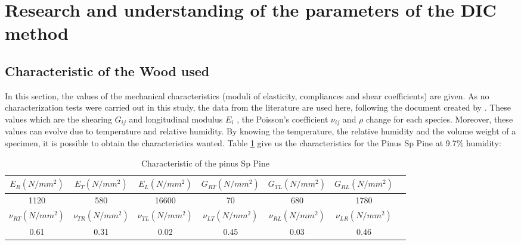 \section{Research and understanding of the parameters of the DIC method}

\subsection{Characteristic of the Wood used}

In this section, the values of the mechanical characteristics (moduli of elasticity, compliances and shear coefficients) are given. As no characterization tests were carried out in this study, the data from the literature are used here, following the document created by \cite{GuitardandElAmri1987}. These values which are the shearing $G_{ij}$ and longitudinal modulus $E_i$ , the Poisson’s coefficient $\nu_{ij}$ and $\rho$ change for each species. Moreover, these values can evolve due to temperature and relative humidity. By knowing the temperature, the relative humidity and the volume weight of a specimen, it is possible to obtain the characteristics wanted. Table \ref{fig:fig29} give us the characteristics for the Pinus Sp Pine at 9.7$\%$ humidity:


\begin{table} [h]
	\begin{tabular}{ccccccc}
		\toprule %
		  $E_R(N/mm^2)$ & $E_T(N/mm^2)$ & $E_L(N/mm^2)$ & $G_{RT}(N/mm^2)$ & $G_{TL}(N/mm^2)$ & $G_{RL}(N/mm^2)$\\\midrule
		  1120 & 580 & 16600 & 70 & 680 & 1780 \\
		\bottomrule %
		\toprule
		$\nu_{RT}(N/mm^2)$ & $\nu_{TR}(N/mm^2)$ & $\nu_{TL}(N/mm^2)$ & $\nu_{LT}(N/mm^2)$ & $\nu_{RL}(N/mm^2)$ & $\nu_{LR}(N/mm^2)$ \\\midrule
		0.61 & 0.31 & 0.02 & 0.45 & 0.03 & 0.46 \\
		\bottomrule
	\end{tabular}
	\caption{Characteristic of the pinus Sp Pine}
	\label{fig:fig29}
\end{table}

\begin{comment}
\begin{table}[htp]
	\centering
	\texttt{[image: fig28]}
	\label{fig:fig28}
\end{table}


\begin{table}[htp]
	\centering
	\texttt{[image: fig29]}
	\caption{Characteristic of the Pinus Sp Pine}
	\label{fig:fig29}
\end{table}
\end{comment}

